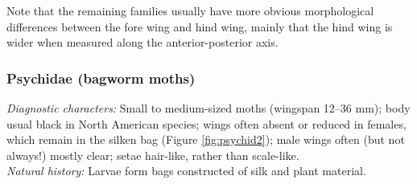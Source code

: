 \documentclass[letterpaper, 11pt]{article}
\begin{document}
\noindent{}Note that the remaining families usually have more obvious morphological differences between the fore wing and hind wing, mainly that the hind wing is wider when measured along the anterior-posterior axis.





\subsubsection{Psychidae (bagworm moths)}
\noindent{}\textit{Diagnostic characters:} Small to medium-sized moths (wingspan 12--36 mm); body usual black in North American species; wings often absent or reduced in females, which remain in the silken bag (Figure \ref{fig:psychid2}); male wings often (but not always!) mostly clear; setae hair-like, rather than scale-like.\\

\noindent{}\textit{Natural history:} Larvae form bags constructed of silk and plant material.
\end{document}
